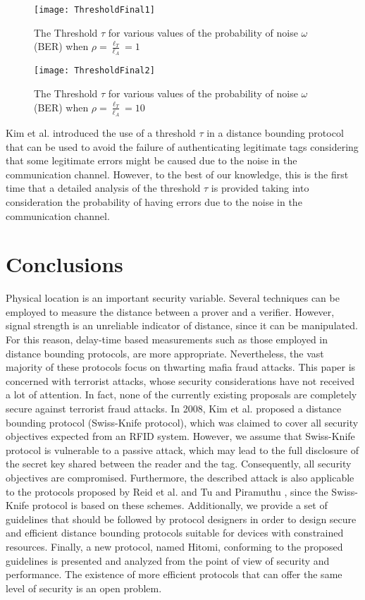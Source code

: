 \documentclass{article}
\newcommand \thr {\tau}
\newcommand \LA {\ell_A}
\newcommand \LT {\ell_T}
\begin{document}
\begin{figure}
\centering
\texttt{[image: ThresholdFinal1]}
  \caption{The Threshold $\thr$  for various values of the probability of noise $\omega$ (BER) when $\rho=\frac {\LT} {\LA}=1$ }\label{fig::figu1}
\end{figure}

\begin{figure}
\centering
\texttt{[image: ThresholdFinal2]}
  \caption{The Threshold $\thr$  for various values of the probability of noise $\omega$ (BER) when $\rho=\frac {\LT} {\LA}=10$ }\label{fig::figu2}
\end{figure}



Kim et al. \cite{KimAKSP-2008-icisc} introduced the use of a threshold $\tau$ in a distance
bounding protocol that can be used to avoid the failure of
authenticating legitimate tags considering that some legitimate errors
might be caused due to the noise in the communication channel.
However, to the best of our knowledge, this is the first time that a
detailed analysis of the threshold $\tau$ is provided taking into
consideration the probability of having errors due to the noise in the
communication channel.

\section{Conclusions}

Physical location is an important  security variable. Several techniques can be employed to measure the distance between a prover and a verifier. However, signal strength is an unreliable indicator of distance, since it can be manipulated. For this reason, delay-time based measurements such as those employed in distance bounding protocols, are more appropriate.  Nevertheless, the vast majority of these protocols focus on thwarting mafia fraud attacks. This paper is concerned with terrorist attacks, whose security considerations have not received a lot of attention. In fact, none of the currently existing proposals are completely secure against terrorist fraud attacks.  In 2008, Kim et al. \cite{KimAKSP-2008-icisc}  proposed a distance bounding protocol (Swiss-Knife protocol), which was claimed to cover all security objectives expected from an RFID system. However,  we assume that Swiss-Knife protocol is vulnerable to a passive attack, which may lead to the full disclosure of the secret key shared between the reader and the tag.  Consequently,  all security objectives are compromised. Furthermore, the described attack is also applicable to the protocols proposed by Reid et al.  \cite{reid2007} and Tu and Piramuthu \cite{TuP-2007-rfidtechnology}, since the Swiss-Knife protocol is based on these schemes.  Additionally, we provide  a set of guidelines that should be followed by protocol designers in order to design secure and efficient distance bounding protocols suitable for devices with constrained resources.  Finally, a new protocol, named Hitomi, conforming to the proposed guidelines is presented and analyzed from the point of view of security and performance.  The existence of more efficient protocols that can offer the same level of security is an open problem.
\end{document}
